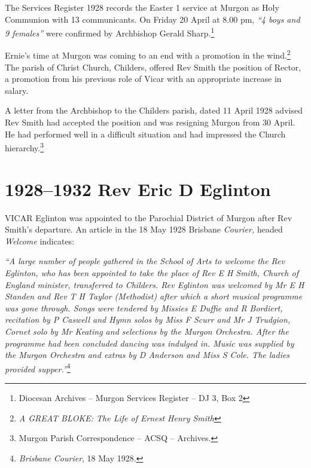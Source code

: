 The Services Register 1928 records the Easter 1 service at Murgon as Holy Communion with 13 communicants. On Friday 20 April at 8.00 pm, \emph{``4 boys and 9 females''} were confirmed by Archbishop Gerald Sharp.\footnote{Diocesan Archives -- Murgon Services Register -- DJ 3, Box 2}


Ernie's time at Murgon was coming to an end with a promotion in the wind.\footnote{\emph{A GREAT BLOKE: The Life of Ernest Henry Smith}} The parish of Christ Church, Childers, offered Rev Smith the position of Rector, a promotion from his previous role of Vicar with an appropriate increase in salary.


A letter from the Archbishop to the Childers parish, dated 11 April 1928 advised Rev Smith had accepted the position and was resigning Murgon from 30 April. He had performed well in a difficult situation and had impressed the Church hierarchy.\footnote{Murgon Parish Correspondence -- ACSQ -- Archives.}


\printendnotes[custom]
\setcounter{endnote}{0}




\chapter{1928--1932 Rev Eric D Eglinton}
\nobalance


\lettrine[lines=3]{V}{ICAR}
 Eglinton was appointed to the Parochial District of Murgon after Rev Smith's departure. An article in the 18 May 1928 Brisbane \emph{Courier,} headed \emph{Welcome} indicates:

\emph{``A large number of people gathered in the School of Arts to welcome the Rev Eglinton, who has been appointed to take the place of Rev E H Smith, Church of England minister, transferred to Childers. Rev Eglinton was welcomed by Mr E H Standen and Rev T H Taylor (Methodist) after which a short musical programme was gone through. Songs were tendered by Missies E Duffie and R Bordiert, recitation by P Caswell and Hymn solos by Miss F Scurr and Mr J Trudgion, Cornet solo by Mr Keating and selections by the Murgon Orchestra. After the programme had been concluded dancing was indulged in. Music was supplied by the Murgon Orchestra and extras by D Anderson and Miss S Cole. The ladies provided supper.''}\footnote{\emph{Brisbane Courier}, 18 May 1928.}


